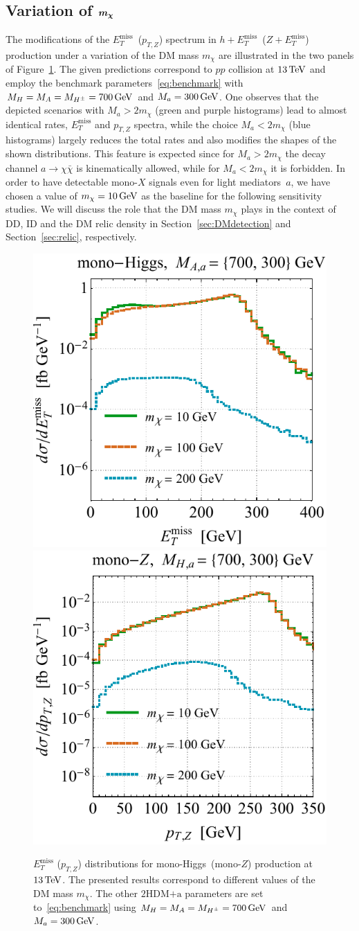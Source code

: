 \documentclass[a4paper, 11pt,notoc]{article}
\newcommand{\MET}{\ensuremath{E_T^\mathrm{miss}}\xspace}
\newcommand{\mA}{\ensuremath{M_{A}}\xspace}
\newcommand{\ma}{\ensuremath{M_{a}}\xspace}
\newcommand{\mH}{\ensuremath{M_{H}}\xspace}
\newcommand{\mHc}{\ensuremath{M_{H^{\pm}}}\xspace}
\newcommand{\hdma}{\ensuremath{\textrm{2HDM+a}}\xspace}
\def\bm#1{\mbox{\boldmath$#1$\unboldmath}}
\begin{document}
\subsection*{Variation of $\bm{m_\chi}$}

The modifications of the $\MET$~($p_{T,Z}$) spectrum in $h+\MET$~($Z+\MET$) production under a variation of the DM mass $m_\chi$ are illustrated in the two panels of Figure~\ref{fig:mdmvar}. The given predictions correspond to $pp$ collision at $13 \, {\rm TeV}$ and employ the benchmark parameters~\eqref{eq:benchmark} with $\mH = \mA = \mHc = 700 \, {\rm GeV}$ and $\ma = 300 \, {\rm GeV}$. One observes that the depicted scenarios with $\ma  > 2 m_\chi$ (green and purple histograms) lead to almost identical rates, $\MET$ and $p_{T,Z}$ spectra, while the choice $\ma  < 2 m_\chi$ (blue histograms) 
largely reduces the total rates and also modifies the shapes of the shown distributions. This feature is expected since for $\ma > 2 m_\chi$ the decay channel $a \to \chi \bar \chi$ is kinematically allowed, while for $\ma < 2 m_\chi$ it is forbidden. In order to have detectable mono-$X$ signals even for light mediators~$a$, we have chosen a value of  $m_\chi = 10 \, {\rm GeV}$ as the baseline for the following sensitivity studies.  We will discuss the role that the DM mass $m_\chi$ plays in the context of DD, ID and the DM relic density in Section~\ref{sec:DMdetection}  and Section~\ref{sec:relic}, respectively. 

\begin{figure}[t!]
\centering
\includegraphics[height=0.45\textwidth]{mdml.pdf} \qquad 
\includegraphics[height=0.45\textwidth]{mdmr.pdf}
\vspace{2mm}
\caption{\label{fig:mdmvar} $\MET$ ($p_{T,Z}$) distributions for mono-Higgs~(mono-$Z$) production at $13 \, {\rm TeV}$. The presented results correspond to different values of the DM mass $m_\chi$. The other \hdma parameters are set to~\eqref{eq:benchmark} using $\mH = \mA = \mHc = 700 \, {\rm GeV}$ and $\ma = 300 \, {\rm GeV}$. }
\end{figure}
\end{document}
